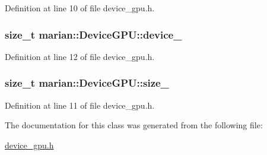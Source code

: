 Definition at line 10 of file device\+\_\+gpu.\+h.

\subsubsection[{\texorpdfstring{device\+\_\+}{device_}}]{\setlength{\rightskip}{0pt plus 5cm}size\+\_\+t marian\+::\+Device\+G\+P\+U\+::device\+\_\+\hspace{0.3cm}{\ttfamily [private]}}\hypertarget{classmarian_1_1DeviceGPU_a6bd2e043ef027d56ee0d0c734945508b}{}\label{classmarian_1_1DeviceGPU_a6bd2e043ef027d56ee0d0c734945508b}


Definition at line 12 of file device\+\_\+gpu.\+h.

\subsubsection[{\texorpdfstring{size\+\_\+}{size_}}]{\setlength{\rightskip}{0pt plus 5cm}size\+\_\+t marian\+::\+Device\+G\+P\+U\+::size\+\_\+\hspace{0.3cm}{\ttfamily [private]}}\hypertarget{classmarian_1_1DeviceGPU_a7c218fa5b3219556c87956c046a0e33a}{}\label{classmarian_1_1DeviceGPU_a7c218fa5b3219556c87956c046a0e33a}


Definition at line 11 of file device\+\_\+gpu.\+h.



The documentation for this class was generated from the following file\+:\begin{DoxyCompactItemize}
\item 
\hyperlink{device__gpu_8h}{device\+\_\+gpu.\+h}\end{DoxyCompactItemize}
